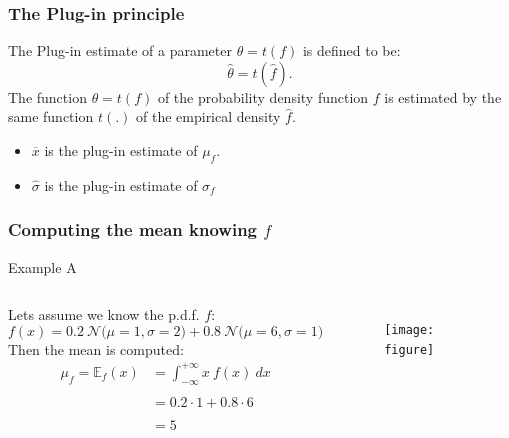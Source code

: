 \frame
{
\frametitle{The Plug-in principle}
\begin{definition}
The \alert{Plug-in} estimate of a parameter $\theta=t(f)$ is defined to be:
$$ 
\hat{\theta}=t(\hat{f}).
$$ 
\small{The function $\theta=t(f)$ of the probability density function $f$ is estimated by the same  function $t(.)$ of the empirical density $\hat{f}$.}
\end{definition}


\begin{exampleblock}{}
\begin{itemize}
\item $\overline{x}$ is the plug-in estimate of $\mu_f$.
\item $\hat{\sigma}$  is the plug-in estimate of $\sigma_f$
\end{itemize}
\end{exampleblock}
}
\frame
{
\frametitle{Computing the  mean knowing $f$}

\begin{exampleblock}{Example A}
\begin{columns}
Lets assume we know the p.d.f. $f$: 
$$
f(x)=0.2\ \mathcal{N}(\scriptstyle \mu=1,\sigma=2 \displaystyle) +0.8\  \mathcal{N}( \scriptstyle\mu=6,\sigma=1 \displaystyle)
$$
Then the mean  is computed:
$$
\begin{array}{ll}
\mu_{f}=\mathbb{E}_{f}(x)&=\int_{-\infty}^{+\infty} x\ f(x)\ dx \\
&\\
&=0.2\cdot 1 + 0.8 \cdot 6 \\
&\\
&=5\\
\end{array}
$$
\begin{figure}[h!t]
\begin{center}
\texttt{[image: figure]}
\end{center}
\end{figure}
\end{columns}
\end{exampleblock}
}
